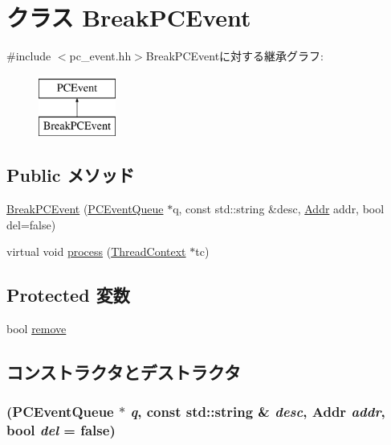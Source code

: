 \hypertarget{classBreakPCEvent}{
\section{クラス BreakPCEvent}
\label{classBreakPCEvent}
}


{\ttfamily \#include $<$pc\_\-event.hh$>$}BreakPCEventに対する継承グラフ:\begin{figure}[H]
\begin{center}
\leavevmode
\includegraphics[height=2cm]{classBreakPCEvent}
\end{center}
\end{figure}
\subsection*{Public メソッド}
\begin{DoxyCompactItemize}
\item 
\hyperlink{classBreakPCEvent_a522e1b07b780009ce4bda34f68e63ad8}{BreakPCEvent} (\hyperlink{classPCEventQueue}{PCEventQueue} $\ast$q, const std::string \&desc, \hyperlink{base_2types_8hh_af1bb03d6a4ee096394a6749f0a169232}{Addr} addr, bool del=false)
\item 
virtual void \hyperlink{classBreakPCEvent_ad66a9d5ec7cfe597b848a17c0df5cc28}{process} (\hyperlink{classThreadContext}{ThreadContext} $\ast$tc)
\end{DoxyCompactItemize}
\subsection*{Protected 変数}
\begin{DoxyCompactItemize}
\item 
bool \hyperlink{classBreakPCEvent_a85e26bd0985e6b9f842e0f195beccb6c}{remove}
\end{DoxyCompactItemize}


\subsection{コンストラクタとデストラクタ}
\hypertarget{classBreakPCEvent_a522e1b07b780009ce4bda34f68e63ad8}{
\subsubsection[{BreakPCEvent}]{ ({\bf PCEventQueue} $\ast$ {\em q}, \/  const std::string \& {\em desc}, \/  {\bf Addr} {\em addr}, \/  bool {\em del} = {\ttfamily false})}}
\label{classBreakPCEvent_a522e1b07b780009ce4bda34f68e63ad8}



